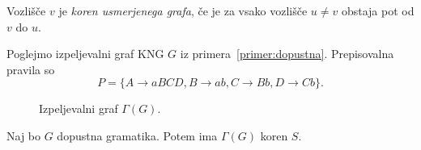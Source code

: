 \documentclass[fin1, tisk]{fmfdelo}
\theoremstyle{definition}
\begin{document}
\begin{definicija}
    Vozlišče $v$ je \emph{koren usmerjenega grafa}, če je za vsako vozlišče $u \neq v$ obstaja
    pot od $v$ do $u$.
\end{definicija}

\begin{primer}\label{primer:izpeljevalni}
    Poglejmo izpeljevalni graf KNG $G$ iz primera~\ref{primer:dopustna}. Prepisovalna pravila so
    \[
        P = \{ A \rightarrow \mathit{aBCD}, B \rightarrow \mathit{ab}, C \rightarrow 
        \mathit{Bb}, 
        D \rightarrow \mathit{Cb} \}.
    \]
    \begin{figure}[H]
        \centering
    \caption{Izpeljevalni graf $\Gamma(G)$.}
    \end{figure}
\end{primer}

\begin{lema}\label{lema:koren}
    Naj bo $G$ dopustna gramatika. Potem ima $\Gamma(G)$ koren $S$.
\end{lema}
\end{document}
